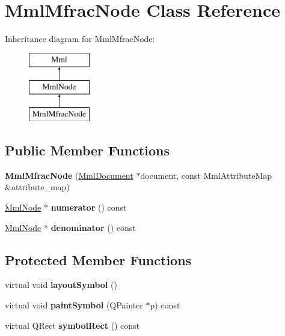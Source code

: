 \hypertarget{class_mml_mfrac_node}{}\section{Mml\+Mfrac\+Node Class Reference}
\label{class_mml_mfrac_node}
Inheritance diagram for Mml\+Mfrac\+Node\+:\begin{figure}[H]
\begin{center}
\leavevmode
\includegraphics[height=3.000000cm]{class_mml_mfrac_node}
\end{center}
\end{figure}
\subsection*{Public Member Functions}
\begin{DoxyCompactItemize}
\item 
\mbox{\label{class_mml_mfrac_node_a22c5404fc6261a517c27145647c89a86}} 
{\bfseries Mml\+Mfrac\+Node} (\mbox{\hyperlink{class_mml_document}{Mml\+Document}} $\ast$document, const Mml\+Attribute\+Map \&attribute\+\_\+map)
\item 
\mbox{\label{class_mml_mfrac_node_a2edc68e1d2aaa51e299b9c58ba5a14d7}} 
\mbox{\hyperlink{class_mml_node}{Mml\+Node}} $\ast$ {\bfseries numerator} () const
\item 
\mbox{\label{class_mml_mfrac_node_a78a635e792c36b0babe1edffe25d5ad1}} 
\mbox{\hyperlink{class_mml_node}{Mml\+Node}} $\ast$ {\bfseries denominator} () const
\end{DoxyCompactItemize}
\subsection*{Protected Member Functions}
\begin{DoxyCompactItemize}
\item 
\mbox{\label{class_mml_mfrac_node_af988af766b6c7bbfb778637138a1f4fb}} 
virtual void {\bfseries layout\+Symbol} ()
\item 
\mbox{\label{class_mml_mfrac_node_a509f0f047263528c7be68b5c70715307}} 
virtual void {\bfseries paint\+Symbol} (Q\+Painter $\ast$p) const
\item 
\mbox{\label{class_mml_mfrac_node_ad8f5e4562de7ddb02672c6232521964d}} 
virtual Q\+Rect {\bfseries symbol\+Rect} () const
\end{DoxyCompactItemize}
